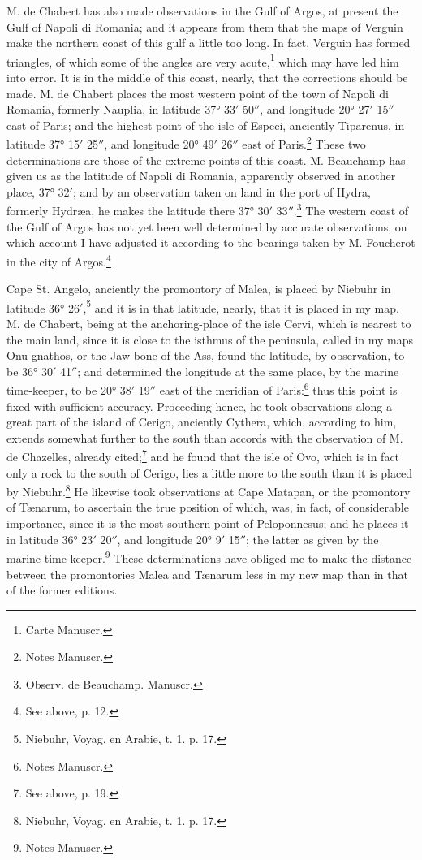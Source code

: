 \documentclass[a4paper, 11pt, oneside, polutonikogreek, english]{article}
\begin{document}
M. de Chabert has also made observations in the Gulf of Argos, at present the Gulf of Napoli di Romania; and it appears from them that the maps of Verguin make the northern coast of this gulf a little too long. In fact, Verguin has formed triangles, of which some of the angles are very acute,\footnote{Carte Manuscr.} which may have led him into error. It is in the middle of this coast, nearly, that the corrections should be made. M. de Chabert places the most western point of the town of Napoli di Romania, formerly Nauplia, in latitude 37° 33$'$ 50$''$, and longitude 20° 27$'$ 15$''$ east of Paris; and the highest point of the isle of Especi, anciently Tiparenus, in latitude 37° 15$'$ 25$''$, and longitude 20° 49$'$ 26$''$ east of Paris.\footnote{Notes Manuscr.} These two determinations are those of the extreme points of this coast. M. Beauchamp has given us as the latitude of Napoli di Romania, apparently observed in another place, 37° 32$'$; and by an observation taken on land in the port of Hydra, formerly Hydræa, he makes the latitude there 37° 30$'$ 33$''$.\footnote{Observ. de Beauchamp. Manuscr.} The western coast of the Gulf of Argos has not yet been well determined by accurate observations, on which account I have adjusted it according to the bearings taken by M. Foucherot in the city of Argos.\footnote{See above, p. 12.}

Cape St. Angelo, anciently the promontory of Malea, is placed by Niebuhr in latitude 36° 26$'$,\footnote{Niebuhr, Voyag. en Arabie, t. 1. p. 17.} and it is in that latitude, nearly, that it is placed in my map. M. de Chabert, being at the anchoring-place of the isle Cervi, which is nearest to the main land, since it is close to the isthmus of the peninsula, called in my maps Onu-gnathos, or the Jaw-bone of the Ass, found the latitude, by observation, to be 36° 30$'$ 41$''$; and determined the longitude at the same place, by the marine time-keeper, to be 20° 38$'$ 19$''$ east of the meridian of Paris:\footnote{Notes Manuscr.} thus this point is fixed with sufficient accuracy. Proceeding hence, he took observations along a great part of the island of Cerigo, anciently Cythera, which, according to him, extends somewhat further to the south than accords with the observation of M. de Chazelles, already cited;\footnote{See above, p. 19.} and he found that the isle of Ovo, which is in fact only a rock to the south of Cerigo, lies a little more to the south than it is placed by Niebuhr.\footnote{Niebuhr, Voyag. en Arabie, t. 1. p. 17.} He likewise took observations at Cape Matapan, or the promontory of Tænarum, to ascertain the true position of which, was, in fact, of considerable importance, since it is the most southern point of Peloponnesus; and he places it in latitude 36° 23$'$ 20$''$, and longitude 20° 9$'$ 15$''$; the latter as given by the marine time-keeper.\footnote{Notes Manuscr.} These determinations have obliged me to make the distance between the promontories Malea and Tænarum less in my new map than in that of the former editions.
\end{document}

